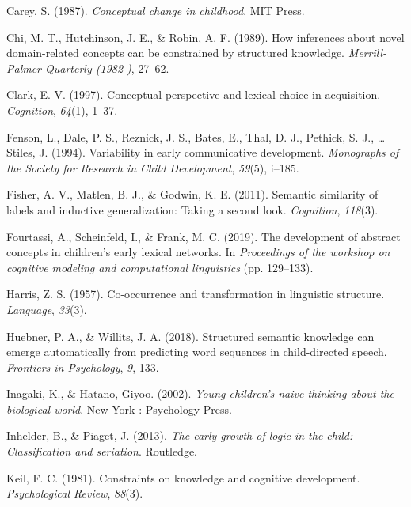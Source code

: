 \documentclass[english,,man,floatsintext]{apa6}
\begin{document}
\leavevmode\hypertarget{ref-carey1987}{}%
Carey, S. (1987). \emph{Conceptual change in childhood}. MIT Press.

\leavevmode\hypertarget{ref-chi1989}{}%
Chi, M. T., Hutchinson, J. E., \& Robin, A. F. (1989). How inferences about novel domain-related concepts can be constrained by structured knowledge. \emph{Merrill-Palmer Quarterly (1982-)}, 27--62.

\leavevmode\hypertarget{ref-clark1997}{}%
Clark, E. V. (1997). Conceptual perspective and lexical choice in acquisition. \emph{Cognition}, \emph{64}(1), 1--37.

\leavevmode\hypertarget{ref-fenson94}{}%
Fenson, L., Dale, P. S., Reznick, J. S., Bates, E., Thal, D. J., Pethick, S. J., \ldots{} Stiles, J. (1994). Variability in early communicative development. \emph{Monographs of the Society for Research in Child Development}, \emph{59}(5), i--185.

\leavevmode\hypertarget{ref-fisher2011}{}%
Fisher, A. V., Matlen, B. J., \& Godwin, K. E. (2011). Semantic similarity of labels and inductive generalization: Taking a second look. \emph{Cognition}, \emph{118}(3).

\leavevmode\hypertarget{ref-fourtassi2019}{}%
Fourtassi, A., Scheinfeld, I., \& Frank, M. C. (2019). The development of abstract concepts in children's early lexical networks. In \emph{Proceedings of the workshop on cognitive modeling and computational linguistics} (pp. 129--133).

\leavevmode\hypertarget{ref-harris1957}{}%
Harris, Z. S. (1957). Co-occurrence and transformation in linguistic structure. \emph{Language}, \emph{33}(3).

\leavevmode\hypertarget{ref-huebner2018}{}%
Huebner, P. A., \& Willits, J. A. (2018). Structured semantic knowledge can emerge automatically from predicting word sequences in child-directed speech. \emph{Frontiers in Psychology}, \emph{9}, 133.

\leavevmode\hypertarget{ref-inagaki2002}{}%
Inagaki, K., \& Hatano, Giyoo. (2002). \emph{Young children's naive thinking about the biological world}. New York : Psychology Press.

\leavevmode\hypertarget{ref-inhelder2013}{}%
Inhelder, B., \& Piaget, J. (2013). \emph{The early growth of logic in the child: Classification and seriation}. Routledge.

\leavevmode\hypertarget{ref-keil1981}{}%
Keil, F. C. (1981). Constraints on knowledge and cognitive development. \emph{Psychological Review}, \emph{88}(3).
\end{document}
